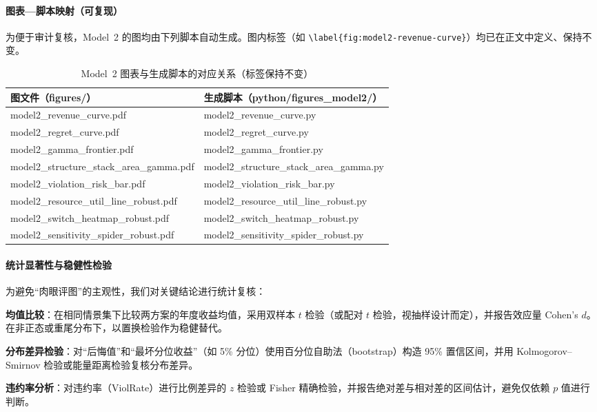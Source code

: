 \paragraph{图表—脚本映射（可复现）}
为便于审计复核，Model~2 的图均由下列脚本自动生成。图内标签（如 \verb|\label{fig:model2-revenue-curve}|）均已在正文中定义、保持不变。
\begin{table}[htbp]
  \centering
  \small
  \setlength{\tabcolsep}{6pt}
  \begin{tabular}{@{}ll@{}}
    \toprule
    图文件（figures/） & 生成脚本（python/figures\_model2/） \\
    \midrule
    model2\_revenue\_curve.pdf & model2\_revenue\_curve.py \\
    model2\_regret\_curve.pdf & model2\_regret\_curve.py \\
    model2\_gamma\_frontier.pdf & model2\_gamma\_frontier.py \\
    model2\_structure\_stack\_area\_gamma.pdf & model2\_structure\_stack\_area\_gamma.py \\
    model2\_violation\_risk\_bar.pdf & model2\_violation\_risk\_bar.py \\
    model2\_resource\_util\_line\_robust.pdf & model2\_resource\_util\_line\_robust.py \\
    model2\_switch\_heatmap\_robust.pdf & model2\_switch\_heatmap\_robust.py \\
    model2\_sensitivity\_spider\_robust.pdf & model2\_sensitivity\_spider\_robust.py \\
    \bottomrule
  \end{tabular}
  \caption{Model~2 图表与生成脚本的对应关系（标签保持不变）}
  \label{tab:model2-fig-script-map}
\end{table}

\paragraph{统计显著性与稳健性检验}
为避免“肉眼评图”的主观性，我们对关键结论进行统计复核：

\textbf{均值比较}：在相同情景集下比较两方案的年度收益均值，采用双样本 $t$ 检验（或配对 $t$ 检验，视抽样设计而定），并报告效应量 Cohen's $d$。在非正态或重尾分布下，以置换检验作为稳健替代。

\textbf{分布差异检验}：对“后悔值”和“最坏分位收益”（如 5\% 分位）使用百分位自助法（bootstrap）构造 95\% 置信区间，并用 Kolmogorov–Smirnov 检验或能量距离检验复核分布差异。

\textbf{违约率分析}：对违约率（ViolRate）进行比例差异的 $z$ 检验或 Fisher 精确检验，并报告绝对差与相对差的区间估计，避免仅依赖 $p$ 值进行判断。

